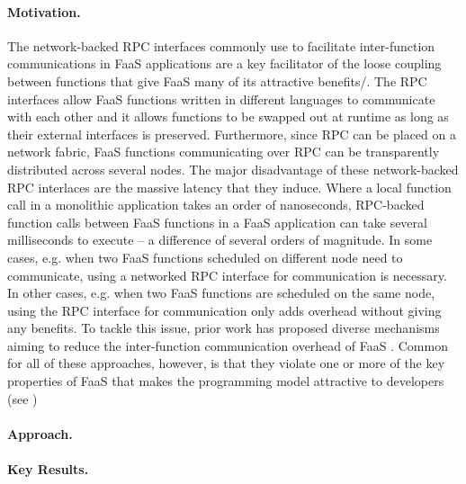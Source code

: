 \documentclass[../main.tex]{subfiles}
\begin{document}
\begin{refsection}
\paragraph{Motivation.}
The network-backed RPC interfaces commonly use to facilitate
inter-function communications in FaaS applications are a key
facilitator of the loose coupling between functions that give FaaS
many of its attractive benefits/. The RPC interfaces allow FaaS
functions written in different languages to communicate with each
other and it allows functions to be swapped out at runtime as long as
their external interfaces is preserved. Furthermore, since RPC can be
placed on a network fabric, FaaS functions communicating over RPC can
be transparently distributed across several nodes. The major
disadvantage of these network-backed RPC interlaces are the massive
latency that they induce. Where a local function call in a monolithic
application takes an order of nanoseconds, RPC-backed function calls
between FaaS functions in a FaaS application can take several
milliseconds to execute -- a difference of several orders of
magnitude. In some cases, e.g. when two FaaS functions scheduled on
different node need to communicate, using a networked RPC interface
for communication is necessary. In other cases, e.g. when two FaaS
functions are scheduled on the same node, using the RPC interface for
communication only adds overhead without giving any benefits. To
tackle this issue, prior work has proposed diverse mechanisms aiming
to reduce the inter-function communication overhead of FaaS
\cite{kotni21_faast,
  mahgoub22_wisef,barcelona-pons19_faas_track,sreekanti20_cloud,shillaker20_faasm,jia21_night}.  Common for all of these approaches, however, is that they violate one or more of the key properties of FaaS that makes the programming model attractive to developers (see )

\paragraph{Approach.}


\paragraph{Key Results.}



\ifx\chapincluded\undefined
  \printbibliography
  \end{refsection}
 \fi
\end{document}
